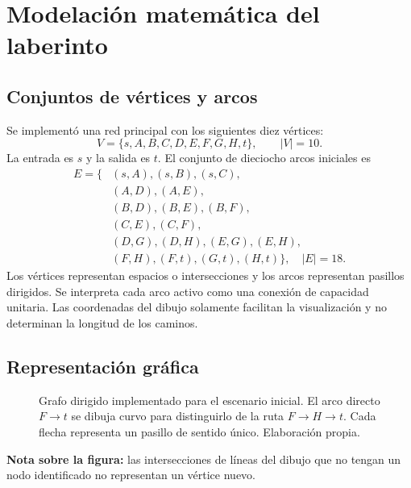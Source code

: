 \documentclass[11pt,a4paper]{article}
\begin{document}
\section{Modelación matemática del laberinto}
\subsection{Conjuntos de vértices y arcos}
Se implementó una red principal con los siguientes diez vértices:
\begin{equation}
V=\{s,A,B,C,D,E,F,G,H,t\}, \qquad |V|=10.
\end{equation}
La entrada es $s$ y la salida es $t$. El conjunto de dieciocho arcos iniciales es
\begin{align}
E=\{&(s,A),(s,B),(s,C),\\
&(A,D),(A,E),\\
&(B,D),(B,E),(B,F),\\
&(C,E),(C,F),\\
&(D,G),(D,H),(E,G),(E,H),\\
&(F,H),(F,t),(G,t),(H,t)\}, \quad |E|=18.
\end{align}
Los vértices representan espacios o intersecciones y los arcos representan pasillos dirigidos. Se interpreta cada arco activo como una conexión de capacidad unitaria. Las coordenadas del dibujo solamente facilitan la visualización y no determinan la longitud de los caminos.

\subsection{Representación gráfica}
\begin{figure}[H]
\centering
{}
\caption{Grafo dirigido implementado para el escenario inicial. El arco directo $F\to t$ se dibuja curvo para distinguirlo de la ruta $F\to H\to t$. Cada flecha representa un pasillo de sentido único. Elaboración propia.}
\label{fig:principal}
\end{figure}
\textbf{Nota sobre la figura:} las intersecciones de líneas del dibujo que no tengan un nodo identificado no representan un vértice nuevo.
\end{document}
